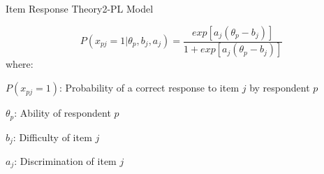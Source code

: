 \documentclass{beamer} %
\begin{document}
\begin{frame}{Item Response Theory}{2-PL Model}

				\begin{equation*}\label{eq:2pl}
				P(x_{pj} = 1|\theta_p, b_j, a_j) = \frac{exp[a_j(\theta_p - b_j)]}{1 + exp[a_j(\theta_p - b_j)]}
			\end{equation*}
		\vspace{3mm}
			where: 
		
			$P(x_{pj} = 1)$: Probability of a correct response to item $j$ by respondent $p$
			
				\vspace{1.5mm}
				
			$\theta_p$: Ability of respondent $p$
			
				\vspace{1.5mm}
			$b_j$: Difficulty of item $j$
			
				\vspace{1.5mm}
			$a_j$: Discrimination of item $j$



\end{frame}
\end{document}

